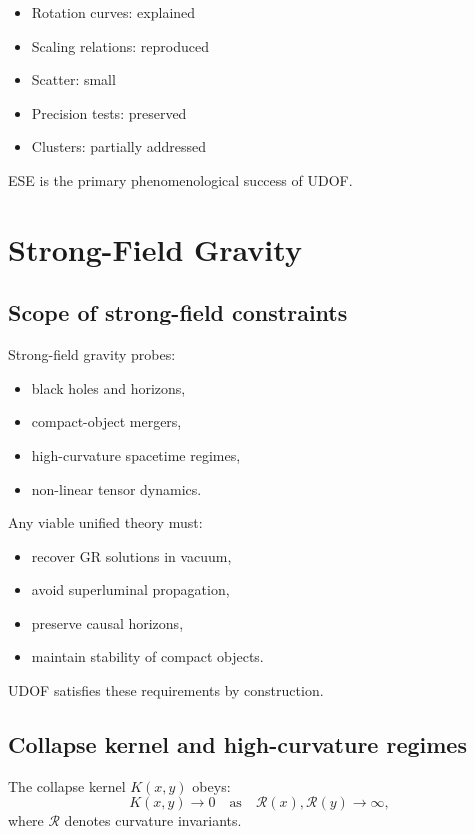 \documentclass[11pt]{book}
\begin{document}
\begin{itemize}
\item Rotation curves: explained
\item Scaling relations: reproduced
\item Scatter: small
\item Precision tests: preserved
\item Clusters: partially addressed
\end{itemize}

ESE is the primary phenomenological success of UDOF.

\chapter{Strong-Field Gravity}

\section{Scope of strong-field constraints}

Strong-field gravity probes:
\begin{itemize}
\item black holes and horizons,
\item compact-object mergers,
\item high-curvature spacetime regimes,
\item non-linear tensor dynamics.
\end{itemize}

Any viable unified theory must:
\begin{itemize}
\item recover GR solutions in vacuum,
\item avoid superluminal propagation,
\item preserve causal horizons,
\item maintain stability of compact objects.
\end{itemize}

UDOF satisfies these requirements by construction.

\section{Collapse kernel and high-curvature regimes}

The collapse kernel $K(x,y)$ obeys:
\begin{equation}
K(x,y) \rightarrow 0
\quad
\text{as}
\quad
\mathcal{R}(x), \mathcal{R}(y) \rightarrow \infty,
\end{equation}
where $\mathcal{R}$ denotes curvature invariants.
\end{document}
